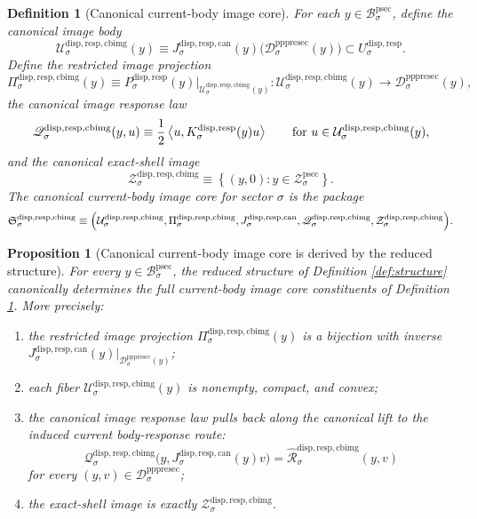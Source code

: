 \documentclass[11pt]{article}
\newcommand{\ProtoSectionBody}[1]{\mathcal B_{#1}^{\mathrm{psec}}}
\newcommand{\ProtoSectionShell}[1]{\mathcal Z_{#1}^{\mathrm{psec}}}
\newcommand{\PrePreProtoSectionResidualBody}[1]{\mathcal D_{#1}^{\mathrm{pppresec}}}
\newcommand{\CurrentBodyImageCore}{\mathfrak S^{\mathrm{disp,resp,cbimg}}}
\newcommand{\SubstrateCarrier}[1]{U_{#1}^{\mathrm{disp,resp}}}
\newcommand{\SubstrateProjection}[1]{P_{#1}^{\mathrm{disp,resp}}}
\newcommand{\SubstrateOperator}[1]{K_{#1}^{\mathrm{disp,resp}}}
\newcommand{\CanonicalLift}[1]{J_{#1}^{\mathrm{disp,resp,can}}}
\newcommand{\CoreForcedBodyResponse}[1]{\widehat{\mathscr R}_{#1}^{\mathrm{disp,resp,cbimg}}}
\newcommand{\CanonicalImageBody}[1]{\mathcal U_{#1}^{\mathrm{disp,resp,cbimg}}}
\newcommand{\ImageProjection}[1]{\Pi_{#1}^{\mathrm{disp,resp,cbimg}}}
\newcommand{\CanonicalImageResponseLaw}[1]{\mathscr Q_{#1}^{\mathrm{disp,resp,cbimg}}}
\newcommand{\CanonicalImageShell}[1]{\mathcal Z_{#1}^{\mathrm{disp,resp,cbimg}}}
\newtheorem{definition}{Definition}
\newtheorem{proposition}{Proposition}
\begin{document}
\begin{definition}[Canonical current-body image core]
\label{def:imagecore}
For each \(y\in\ProtoSectionBody{\sigma}\), define the \emph{canonical image body}
\begin{equation}
\CanonicalImageBody{\sigma}(y)
\equiv
\CanonicalLift{\sigma}(y)\bigl(\PrePreProtoSectionResidualBody{\sigma}(y)\bigr)
\subset
\SubstrateCarrier{\sigma}.
\label{eq:imagebody}
\end{equation}
Define the \emph{restricted image projection}
\begin{equation}
\ImageProjection{\sigma}(y)
\equiv
\SubstrateProjection{\sigma}(y)\big|_{\CanonicalImageBody{\sigma}(y)}
:
\CanonicalImageBody{\sigma}(y)\to\PrePreProtoSectionResidualBody{\sigma}(y),
\label{eq:imageprojection}
\end{equation}
the \emph{canonical image response law}
\begin{equation}
\CanonicalImageResponseLaw{\sigma}(y,u)
\equiv
\frac{1}{2}
\ev{u,\SubstrateOperator{\sigma}(y)u}
\qquad
\text{for }
u\in\CanonicalImageBody{\sigma}(y),
\label{eq:imageresponse}
\end{equation}
and the \emph{canonical exact-shell image}
\begin{equation}
\CanonicalImageShell{\sigma}
\equiv
\left\{
(y,0):y\in\ProtoSectionShell{\sigma}
\right\}.
\label{eq:imageshell}
\end{equation}
The \emph{canonical current-body image core} for sector \(\sigma\) is the package
\[
\CurrentBodyImageCore_{\sigma}
\equiv
\Bigl(
\CanonicalImageBody{\sigma},
\ImageProjection{\sigma},
\CanonicalLift{\sigma},
\CanonicalImageResponseLaw{\sigma},
\CanonicalImageShell{\sigma}
\Bigr).
\]
\end{definition}

\begin{proposition}[Canonical current-body image core is derived by the reduced structure]
\label{prop:derived}
For every \(y\in\ProtoSectionBody{\sigma}\), the reduced structure of Definition \ref{def:structure} canonically determines the full current-body image core constituents of Definition \ref{def:imagecore}. More precisely:
\begin{enumerate}
    \item the restricted image projection \(\ImageProjection{\sigma}(y)\) is a bijection with inverse \(\CanonicalLift{\sigma}(y)\big|_{\PrePreProtoSectionResidualBody{\sigma}(y)}\);
    \item each fiber \(\CanonicalImageBody{\sigma}(y)\) is nonempty, compact, and convex;
    \item the canonical image response law pulls back along the canonical lift to the induced current body-response route:
    \[
    \CanonicalImageResponseLaw{\sigma}\bigl(y,\CanonicalLift{\sigma}(y)v\bigr)
    =
    \CoreForcedBodyResponse{\sigma}(y,v)
    \]
    for every \((y,v)\in\PrePreProtoSectionResidualBody{\sigma}\);
    \item the exact-shell image is exactly \(\CanonicalImageShell{\sigma}\).
\end{enumerate}
\end{proposition}
\end{document}
